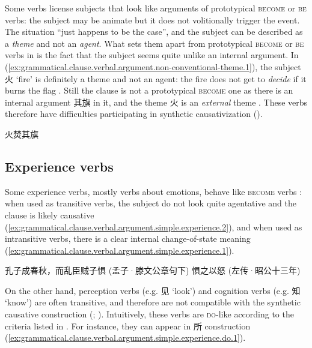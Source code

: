 \documentclass[UTF8, a4paper, oneside, scheme=plain, 12pt]{ctexrep}
\newcommand*{\citepage}[1]{p.~{#1}}
\newcommand*{\term}[1]{\emph{#1}}
\newcommand{\translate}[1]{`#1'}
\newcommand*{\category}[1]{\textsc{#1}}
\begin{document}
Some verbs license subjects that look like arguments of prototypical \category{become} or \category{be} verbs:
the subject may be animate but it does not volitionally trigger the event.
The situation ``just happens to be the case'', and the subject can be described as a \term{theme} and not an \term{agent}.
What sets them apart from prototypical \category{become} or \category{be} verbs 
in 
is the fact that the subject seems quite unlike an internal argument.
In (\ref{ex:grammatical.clause.verbal.argument.non-conventional-theme.1}),
the subject 火 \translate{fire} is definitely a theme and not an agent:
the fire does not get to \emph{decide} if it burns the flag
\citep[\citepage{276}]{meiguang2018}.
Still the clause is not a prototypical \category{become} one
as there is an internal argument 其旗 in it,
and the theme 火 is an \emph{external} theme
\citep[\citepage{353}]{meiguang2018}.
These verbs therefore have difficulties participating in synthetic causativization
().

\begin{exe}
    \ex\label{ex:grammatical.clause.verbal.argument.non-conventional-theme.1} 火焚其旗
\end{exe}

\subsection{Experience verbs}
\label{sec:grammatical.clause.verbal.argument.simple.experience}
Some experience verbs, mostly verbs about emotions, behave like \category{become} verbs
\citep[\citepage{273}]{meiguang2018}:
when used as transitive verbs,
the subject do not look quite agentative and the clause is likely causative
(\ref{ex:grammatical.clause.verbal.argument.simple.experience.2}),
and when used as intransitive verbs,
there is a clear internal change-of-state meaning
(\ref{ex:grammatical.clause.verbal.argument.simple.experience.1}).

\begin{exe}
    \ex\label{ex:grammatical.clause.verbal.argument.simple.experience.1} 孔子成春秋，而乱臣贼子惧 (孟子·滕文公章句下)
    \ex\label{ex:grammatical.clause.verbal.argument.simple.experience.2} 惧之以怒 (左传·昭公十三年)
\end{exe}

On the other hand, perception verbs (e.g. 见 \translate{look}) and cognition verbs (e.g. 知 \translate{know})
are often transitive,
and therefore are not compatible with the synthetic causative construction 
(;
\citealt[\citepage{274}]{meiguang2018}).
Intuitively, these verbs are \category{do}-like according to the criteria listed in .
For instance, they can appear in 所 construction
(\ref{ex:grammatical.clause.verbal.argument.simple.experience.do.1}).
\end{document}
